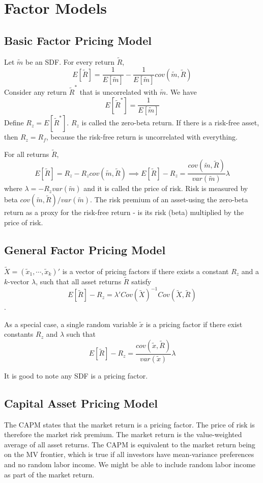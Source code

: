 \documentclass[11pt, a4paper, oneside]{article}
\theoremstyle{definition}
\theoremstyle{proposition}
\theoremstyle{corollary}
\theoremstyle{lemma}
\theoremstyle{theorem}
\begin{document}
\section{Factor Models}
\subsection{Basic Factor Pricing Model}
Let $\tilde{m}$ be an SDF. For every return $\tilde{R}$, 
$$E[\tilde{R}] = \frac{1}{E[\tilde{m}]} - \frac{1}{E[\tilde{m}]}cov(\tilde{m}, \tilde{R})$$
Consider any return $\tilde{R}^*$ that is uncorrelated with $\tilde{m}$. We have
$$E[\tilde{R}^*] = \frac{1}{E[\tilde{m}]}$$
Define $R_z = E[\tilde{R}^*]$. $R_z$ is called the zero-beta return. If there is a risk-free asset, then $R_z = R_f$, because the risk-free return is uncorrelated with everything. 

For all returns $\tilde{R}$, 
$$E[\tilde{R}] = R_z - R_z cov(\tilde{m}, \tilde{R}) \implies E[\tilde{R}] - R_z = \frac{cov(\tilde{m}, \tilde{R})}{var(\tilde{m})} \lambda$$
where $\lambda = -R_zvar(\tilde{m})$ and it is called the price of risk. Risk is measured by beta $cov(\tilde{m}, \tilde{R})/var(\tilde{m})$. The risk premium of an asset-using the zero-beta return as a proxy for the risk-free return - is its risk (beta) multiplied by the price of risk. 

\subsection{General Factor Pricing Model}
$\tilde{X} = (\tilde{x}_1, \cdots, \tilde{x}_k)'$ is a vector of pricing factors if there exists a constant $R_z$ and a $k$-vector $\lambda$, such that all asset returns $\tilde{R}$ satisfy 
$$E[\tilde{R}] - R_z = \lambda'Cov(\tilde{X})^{-1}Cov(\tilde{X}, \tilde{R})$$.

As a special case, a single random variable $\tilde{x}$ is a pricing factor if there exist constants $R_z$ and $\lambda$ such that
$$E[\tilde{R}] - R_z = \frac{cov(\tilde{x}, \tilde{R})}{var(\tilde{x})} \lambda$$

 It is good to note any SDF is a pricing factor. 
 
 \subsection{Capital Asset Pricing Model}
 The CAPM states that the market return is a pricing factor. The price of risk is therefore the market risk premium. The market return is the value-weighted average of all asset returns. The CAPM is equivalent to the market return being on the MV frontier, which is true if all investors have mean-variance preferences and no random labor income. We might be able to include random labor income as part of the market return. 
 
\end{document}
